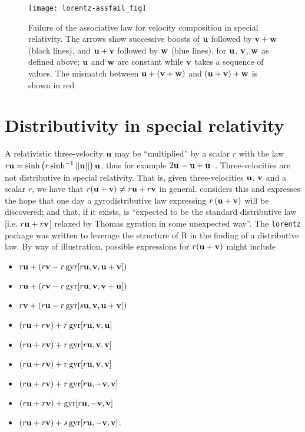 \documentclass[ijoc,nonblindrev]{informs3} %
\begin{document}
\begin{figure}[htbp]
  \begin{center}
\texttt{[image: lorentz-assfail\_fig]}
\caption{Failure of the associative law \label{assfail} for velocity
  composition in special relativity.  The arrows show successive
  boosts of $\mathbf u$ followed by $\mathbf v+\mathbf w$ (black lines), and $\mathbf u+\mathbf v$
  followed by $\mathbf w$ (blue lines), for $\mathbf u$, $\mathbf v$, $\mathbf w$ as defined
  above; $\mathbf u$ and $\mathbf w$ are constant while $\mathbf v$ takes a sequence of
  values. The mismatch between $\mathbf u+\left(\mathbf v+\mathbf w\right)$ and
  $\left(\mathbf u+\mathbf v\right)+\mathbf w$ is shown in red}
  \end{center}
\end{figure}


\section{Distributivity in special relativity}

A relativistic three-velocity $\mathbf u$ may be ``multiplied'' by a scalar
$r$ with the law
$r\mathbf u=\sinh\left(r\sinh^{-1}\left|\left|\mathbf u\right|\right|\right)\mathbf u$,
thus for example $2\mathbf u=\mathbf u+\mathbf u$~\citep{ungar1997}.  Three-velocities
are not distributive in special relativity.  That is, given
three-velocities $\mathbf u$, $\mathbf v$ and a scalar $r$, we have that
$r(\mathbf u+\mathbf v)\neq r\mathbf u+r\mathbf v$ in general.  \cite{ungar1997} considers
this and expresses the hope that one day a gyrodistributive law
expressing $r\left(\mathbf u+\mathbf v\right)$ will be discovered; and that, if it
exists, is ``expected to be the standard distributive law
[i.e. $r\mathbf u+r\mathbf v$] relaxed by Thomas gyration in some unexpected
way''.  The {\tt lorentz} package was written to leverage the
structure of R in the finding of a distributive law.  By way of
illustration, possible expressions for $r(\mathbf u+\mathbf v)$ might include

\begin{itemize}
\item $r\mathbf u  + (r\mathbf v  - r\operatorname{gyr}[r\mathbf u, \mathbf v,\mathbf u+\mathbf v])$
\item $r\mathbf u  + (r\mathbf v  - r\operatorname{gyr}[r\mathbf u, \mathbf v,\mathbf v+\mathbf u])$
\item $r\mathbf v  + (r\mathbf u  - r\operatorname{gyr}[s\mathbf u, \mathbf v,\mathbf u+\mathbf v])$
\item $(r\mathbf u + r\mathbf v)  + r\operatorname{gyr}[r\mathbf u, \mathbf v,\mathbf u]$
\item $(r\mathbf u + r\mathbf v)  + r\operatorname{gyr}[r\mathbf u, \mathbf v,\mathbf v]$
\item $(r\mathbf u + r\mathbf v)  + r\operatorname{gyr}[r\mathbf u, \mathbf v,\mathbf v]$
\item $(r\mathbf u + r\mathbf v)  + r\operatorname{gyr}[r\mathbf u,-\mathbf v,\mathbf v]$
\item $(r\mathbf u + r\mathbf v)  +   \operatorname{gyr}[r\mathbf u,-\mathbf v,\mathbf v]$
\item $(r\mathbf u + r\mathbf v)  + s\operatorname{gyr}[r\mathbf u,-\mathbf v,\mathbf v]$.
\end{itemize}
\end{document}
